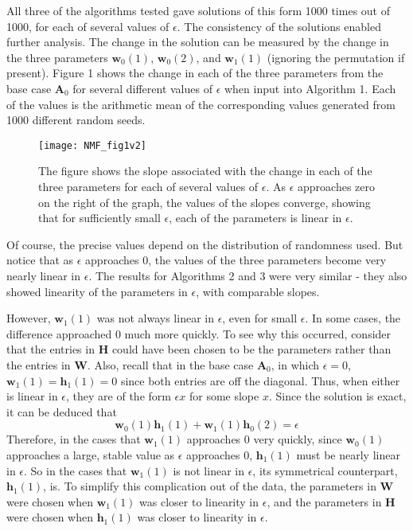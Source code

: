 \documentclass[conference]{IEEEtran}
\begin{document}
All three of the algorithms tested gave solutions of this form 1000 times out of 1000, for each of several values of $ \epsilon $.  The consistency of the solutions enabled further analysis.  The change in the solution can be measured by the change in the three parameters $ \mathbf{w}_0(1) $, $ \mathbf{w}_0(2) $, and $ \mathbf{w}_1(1) $ (ignoring the permutation if present).  Figure 1 shows the change in each of the three parameters from the base case $ \mathbf{A}_0 $ for several different values of $ \epsilon $ when input into Algorithm 1.  Each of the values is the arithmetic mean of the corresponding values generated from 1000 different random seeds.
\begin{figure}
\begin{center}
\texttt{[image: NMF\_fig1v2]}
\caption{The figure shows the slope associated with the change in each of the three parameters for each of several values of $ \epsilon $.  As $ \epsilon $ approaches zero on the right of the graph, the values of the slopes converge, showing that for sufficiently small $ \epsilon $, each of the parameters is linear in $ \epsilon $.}
\end{center}
\end{figure}
Of course, the precise values depend on the distribution of randomness used.  But notice that as $ \epsilon $ approaches 0, the values of the three parameters become very nearly linear in $ \epsilon $.  The results for Algorithms 2 and 3 were very similar - they also showed linearity of the parameters in $ \epsilon $, with comparable slopes.

However, $ \mathbf{w}_1(1) $ was not always linear in $ \epsilon $, even for small $ \epsilon $.  In some cases, the difference approached 0 much more quickly.  To see why this occurred, consider that the entries in $ \mathbf{H} $ could have been chosen to be the parameters rather than the entries in $ \mathbf{W} $.  Also, recall that in the base case $ \mathbf{A}_0 $, in which $ \epsilon = 0 $, $ \mathbf{w}_1(1) = \mathbf{h}_1(1) = 0 $ since both entries are off the diagonal.  Thus, when either is linear in $ \epsilon $, they are of the form $ \epsilon x $ for some slope $ x $.  Since the solution is exact, it can be deduced that
\begin{equation}
\mathbf{w}_0(1) \mathbf{h}_1(1) + \mathbf{w}_1(1) \mathbf{h}_0(2) = \epsilon
\end{equation}
Therefore, in the cases that $ \mathbf{w}_1(1) $ approaches 0 very quickly, since $ \mathbf{w}_0(1) $ approaches a large, stable value as $ \epsilon $ approaches 0, $ \mathbf{h}_1(1) $ must be nearly linear in $ \epsilon $.  So in the cases that $ \mathbf{w}_1(1) $ is not linear in $ \epsilon $, its symmetrical counterpart, $ \mathbf{h}_1(1) $, is.  To simplify this complication out of the data, the parameters in $ \mathbf{W} $ were chosen when $ \mathbf{w}_1(1) $ was closer to linearity in $ \epsilon $, and the parameters in $ \mathbf{H} $ were chosen when $ \mathbf{h}_1(1) $ was closer to linearity in $ \epsilon $.
\end{document}
